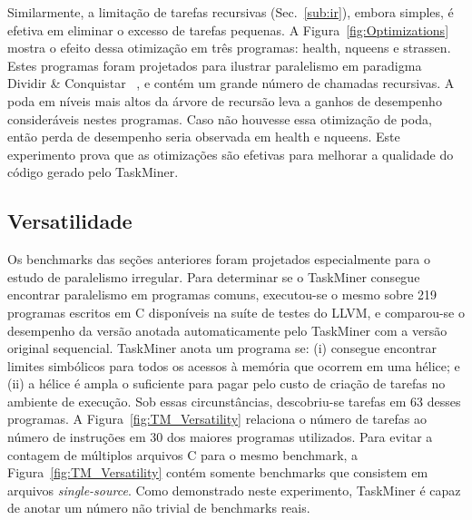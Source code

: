 \documentclass[sigplan,10pt,review]{acmart}
\newcommand\Taskminer{\mbox{\textsf{TaskMiner}}}
\begin{document}
Similarmente, a limitação de tarefas recursivas (Sec.~\ref{sub:ir}), embora simples,
é efetiva em eliminar o excesso de tarefas pequenas. A Figura~\ref{fig:Optimizations} mostra o efeito
dessa otimização em três programas: \textsf{health}, \textsf{nqueens} e
\textsf{strassen}. Estes programas foram projetados para ilustrar paralelismo
em paradigma Dividir \& Conquistar ~\cite{Duran09}, e contém um grande número de chamadas
recursivas. A poda em níveis mais altos da árvore de recursão leva a ganhos de desempenho consideráveis
nestes programas. Caso não houvesse essa otimização de poda, então perda de desempenho seria observada
em  \textsf{health} e \textsf{nqueens}. Este experimento prova que as otimizações são efetivas
para melhorar a qualidade do código gerado pelo \Taskminer{}.

\subsection{Versatilidade}
\label{sub:versatility}

Os benchmarks das seções anteriores foram projetados especialmente para o estudo de 
paralelismo irregular. Para determinar se o \Taskminer{} consegue encontrar paralelismo 
em programas comuns, executou-se o mesmo sobre 219 programas escritos em C disponíveis
na suíte de testes do LLVM, e comparou-se o desempenho da versão anotada automaticamente pelo
\Taskminer{} com a versão original sequencial. 
\Taskminer{} anota um programa se:
(i) consegue encontrar limites simbólicos para todos os acessos à memória que ocorrem em uma hélice; e
(ii) a hélice é ampla o suficiente para pagar pelo custo de criação de tarefas no ambiente de execução.
Sob essas circunstâncias, descobriu-se tarefas em 63 desses programas. A Figura~\ref{fig:TM_Versatility} relaciona
o número de tarefas ao número de instruções em 30 dos maiores programas utilizados.
Para evitar a contagem de múltiplos arquivos C para o mesmo benchmark, a Figura~\ref{fig:TM_Versatility} contém
somente benchmarks que consistem em arquivos {\em single-source}. Como demonstrado neste experimento,
\Taskminer{} é capaz de anotar um número não trivial de benchmarks reais.
\end{document}
